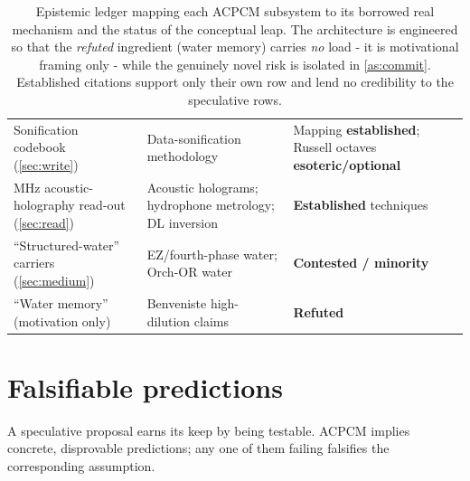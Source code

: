 \documentclass[11pt]{article}
\theoremstyle{definition}
\begin{document}
\begin{table}[t]
\begin{tabularx}{\textwidth}{@{}>{\raggedright\arraybackslash}p{}
  >{\raggedright\arraybackslash}X
  >{\raggedright\arraybackslash}p{}@{}}
Sonification codebook (\cref{sec:write})
  & Data-sonification methodology~\cite{kramer1999nsf,hermann2011handbook}
  & Mapping \textcolor{acpcmteal}{\bfseries established}; Russell octaves \textcolor{warnrule}{\bfseries esoteric/optional}~\cite{russell1926universalone} \\
MHz acoustic-holography read-out (\cref{sec:read})
  & Acoustic holograms; hydrophone metrology; DL inversion~\cite{melde2016holograms,martin2019hydrophone,lin2021dlholograms}
  & \textcolor{acpcmteal}{\bfseries Established} techniques \\
``Structured-water'' carriers (\cref{sec:medium})
  & EZ/fourth-phase water; Orch-OR water~\cite{pollack2013fourth,hameroff2014orchor}
  & \textcolor{warnrule}{\bfseries Contested / minority}~\cite{elton2020ez,tegmark2000decoherence} \\
``Water memory'' (motivation only)
  & Benveniste high-dilution claims~\cite{benveniste1988}
  & \textbf{Refuted}~\cite{maddox1988} \\
\bottomrule
\end{tabularx}
\caption{Epistemic ledger mapping each ACPCM subsystem to its borrowed real mechanism and
the status of the conceptual leap. The architecture is engineered so that the
\emph{refuted} ingredient (water memory) carries \emph{no} load - it is motivational
framing only - while the genuinely novel risk is isolated in \cref{as:commit}. Established
citations support only their own row and lend no credibility to the speculative rows.}
\label{tab:status}
\end{table}

\section{Falsifiable predictions}
\label{sec:predictions}

A speculative proposal earns its keep by being testable. ACPCM implies concrete, disprovable
predictions; any one of them failing falsifies the corresponding assumption.
\end{document}
